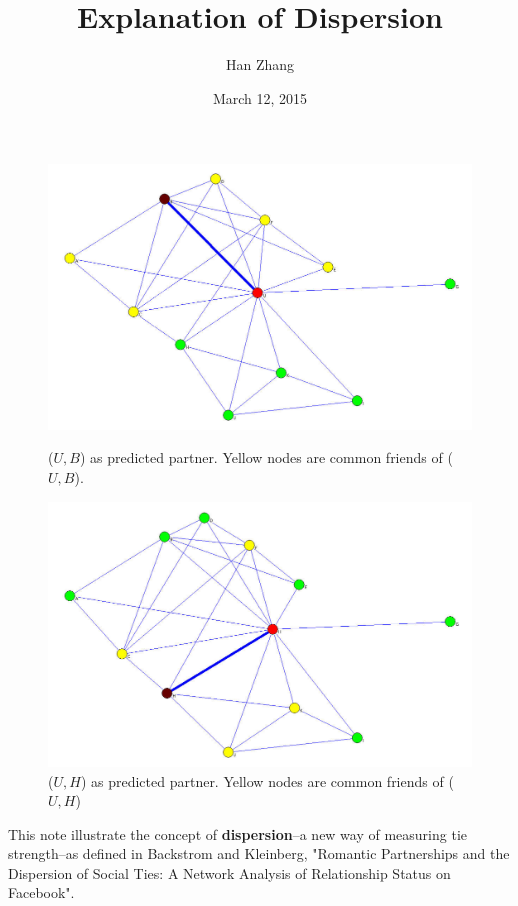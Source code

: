 \documentclass[]{article}
\title{Explanation of Dispersion}
\author{Han Zhang}
\date{March 12, 2015}
\begin{document}
\maketitle

\begin{figure}[ht]
\begin{minipage}[b]{0.5\linewidth}
\centering
\includegraphics[width=\textwidth]{1.jpg}
\caption{($U,B$) as predicted partner. Yellow nodes are common friends of ($U,B$).}
\label{fig:figure1}
\end{minipage}
\hspace{0.5cm}
\begin{minipage}[b]{0.5\linewidth}
\centering
\includegraphics[width=\textwidth]{2.jpg}
\caption{($U,H$) as predicted partner. Yellow nodes are common friends of ($U,H$)}
\label{fig:figure2}
\end{minipage}
\end{figure}

This note illustrate the concept of \textbf{dispersion}--a new way of measuring tie strength--as defined in Backstrom and Kleinberg, "Romantic Partnerships and the Dispersion of Social Ties: A Network Analysis of Relationship Status on Facebook".
\end{document}
